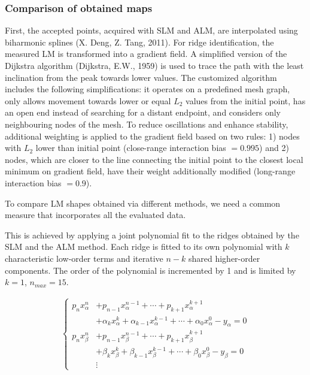 \documentclass[journal,twoside,web]{ieeecolor2}
\begin{document}
\subsubsection{Comparison of obtained maps}
First, the accepted points, acquired with SLM and ALM, are interpolated using biharmonic splines (X.
Deng, Z. Tang, 2011).
For ridge identification, the measured LM is transformed into a gradient field.
A simplified version of the Dijkstra algorithm (Dijkstra, E.W., 1959) is used to trace the path with the least inclination from the peak towards lower values.
The customized algorithm includes the following simplifications: it operates on a predefined mesh graph, only allows movement towards lower or equal $L_2$ values from the initial point, has an open end instead of searching for a distant endpoint, and considers only neighbouring nodes of the mesh.
To reduce oscillations and enhance stability, additional weighting is applied to the gradient field based on two rules: 1) nodes with $L_2$ lower than initial point (close-range interaction bias $= 0.995$) and 2) nodes, which are closer to the line connecting the initial point to the closest local minimum on gradient field, have their weight additionally modified (long-range interaction bias $= 0.9$).


To compare LM shapes obtained via different methods, we need a common measure that incorporates all the evaluated data.


This is achieved by applying a joint polynomial fit to the ridges obtained by the SLM and the ALM method.
Each ridge is fitted to its own polynomial with $k$ characteristic low-order terms and iterative $n-k$ shared higher-order components.
The order of the polynomial is incremented by 1 and is limited by $k = 1$, $n_{max} = 15$.


\begin{align}
\begin{cases}
p_{n} x_{\alpha}^n&+p_{n-1} x_{\alpha}^{n-1}+\cdots+p_{k+1} x_{\alpha}^{k+1} \\
&+\alpha_k x_{\alpha}^{k}+\alpha_{k-1} x_{\alpha}^{k-1}+\cdots+\alpha _0 x_{\alpha}^0-y_{\alpha} =0 \\
p_{n} x_{\beta}^n&+p_{n-1} x_{\beta}^{n-1}+\cdots+p_{k+1} x_{\beta}^{k+1} \\
&+\beta_k x_{\beta}^{k}+\beta_{k-1} x_{\beta}^{k-1}+\cdots+\beta _0 x_{\beta}^0-y_{\beta} =0 \\
& \vdots 
\end{cases}
\label{eq1}
\end{align}
\end{document}
